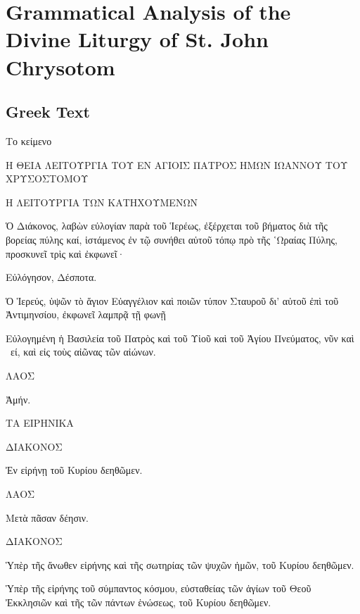\documentclass[extrafontsizes,17pt]{memoir}
\begin{document}
\chapter{Grammatical Analysis of the Divine Liturgy of St. John Chrysotom}

\section{Greek Text}

\pex Το κείμενο

\a

Η ΘΕΙΑ ΛΕΙΤΟΥΡΓΙΑ ΤΟΥ ΕΝ ΑΓΙΟΙΣ ΠΑΤΡΟΣ ΗΜΩΝ ΙΩΑΝΝΟΥ ΤΟΥ ΧΡΥΣΟΣΤΟΜΟΥ

\a

Η ΛΕΙΤΟΥΡΓΙΑ ΤΩΝ ΚΑΤΗΧΟΥΜΕΝΩΝ

\a

Ὁ Διάκονος, λαβὼν εὐλογίαν παρὰ τοῦ Ἱερέως, ἐξέρχεται τοῦ βήματος διὰ τῆς βορείας πύλης καί, ἱστάμενος ἐν τῷ συνήθει αὐτοῦ τόπῳ πρὸ τῆς ῾Ωραίας Πύλης, προσκυνεῖ τρὶς καὶ ἐκφωνεῖ·

\a

Εὐλόγησον, Δέσποτα.

\a 

Ὁ Ἱερεύς, ὑψῶν τὸ ἅγιον Εὐαγγέλιον καὶ ποιῶν τύπον Σταυροῦ δι’ αὐτοῦ ἐπὶ τοῦ Ἀντιμηνσίου, ἐκφωνεῖ λαμπρᾷ τῇ φωνῇ

\a

Εὐλογημένη ἡ Βασιλεία τοῦ Πατρὸς καὶ τοῦ Υἱοῦ καὶ τοῦ Ἁγίου Πνεύματος, νῦν καὶ  εί, καὶ εἰς τοὺς αἰῶνας τῶν αἰώνων.

\a

ΛΑΟΣ

\a 

Ἀμήν.

\a

ΤΑ ΕΙΡΗΝΙΚΑ

\a

ΔΙΑΚΟΝΟΣ

\a

Ἐν εἰρήνῃ τοῦ Κυρίου δεηθῶμεν.

\a

ΛΑΟΣ

\a

Μετὰ πᾶσαν δέησιν.

\a

ΔΙΑΚΟΝΟΣ

\a

Ὑπὲρ τῆς ἄνωθεν εἰρήνης καὶ τῆς σωτηρίας τῶν ψυχῶν ἡμῶν, τοῦ Κυρίου δεηθῶμεν.

\a

Ὑπὲρ τῆς εἰρήνης τοῦ σύμπαντος κόσμου, εὐσταθείας τῶν ἁγίων τοῦ Θεοῦ Ἐκκλησιῶν καὶ τῆς τῶν πάντων ἑνώσεως, τοῦ Κυρίου δεηθῶμεν.
\end{document}
